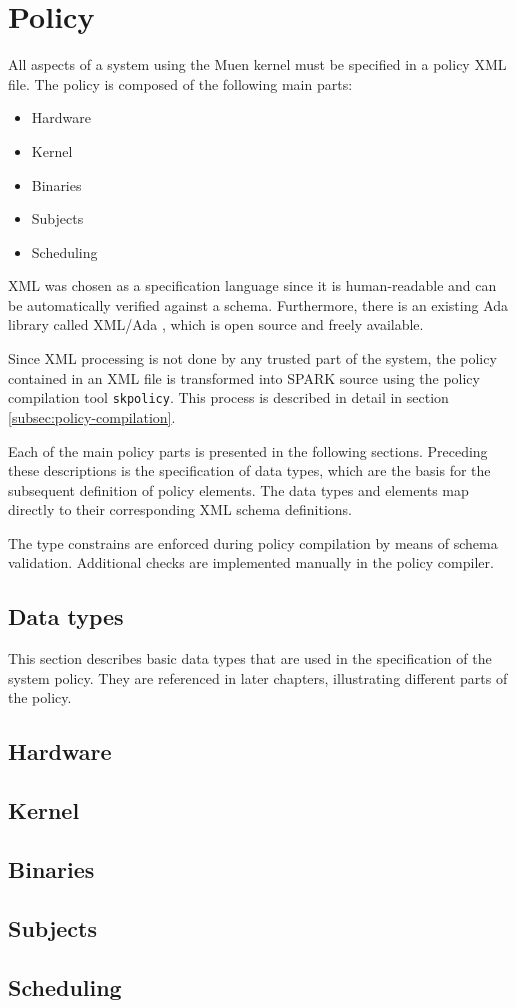 \section{Policy}\label{sec:policy}
All aspects of a system using the Muen kernel must be specified in a policy XML
file. The policy is composed of the following main parts:

\begin{itemize}
	\item Hardware
	\item Kernel
	\item Binaries
	\item Subjects
	\item Scheduling
\end{itemize}

XML was chosen as a specification language since it is human-readable and can
be automatically verified against a schema. Furthermore, there is an existing
Ada library called XML/Ada \cite{xmlada}, which is open source and freely
available.

Since XML processing is not done by any trusted part of the system, the policy
contained in an XML file is transformed into SPARK source using the policy
compilation tool \texttt{skpolicy}. This process is described in detail in
section \ref{subsec:policy-compilation}.

Each of the main policy parts is presented in the following sections. Preceding
these descriptions is the specification of data types, which are the basis for
the subsequent definition of policy elements. The data types and elements map
directly to their corresponding XML schema definitions.

The type constrains are enforced during policy compilation by means of schema
validation. Additional checks are implemented manually in the policy compiler.

\subsection{Data types}
This section describes basic data types that are used in the specification of
the system policy. They are referenced in later chapters, illustrating different
parts of the policy.



\subsection{Hardware}
\label{subsec:hardware}


\subsection{Kernel}


\subsection{Binaries}


\subsection{Subjects}\label{subsec:subjects}


\subsection{Scheduling}

